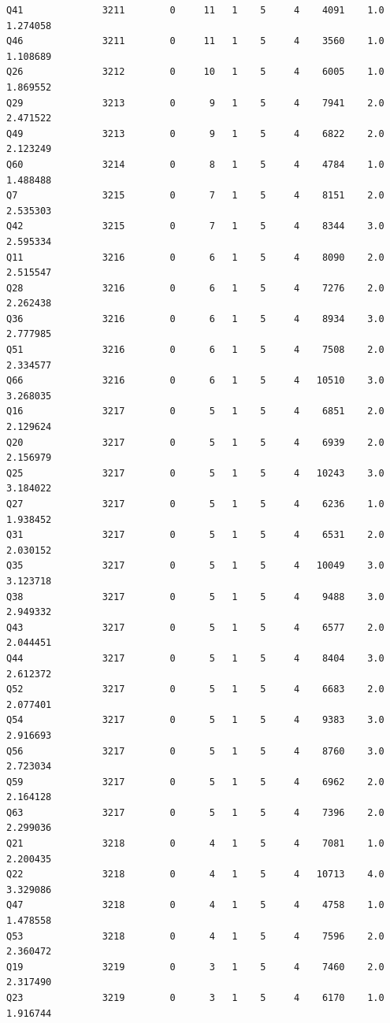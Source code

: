 \documentclass[
]{report}
\begin{document}
\begin{verbatim}
Q41              3211        0     11   1    5     4    4091    1.0    1.274058
Q46              3211        0     11   1    5     4    3560    1.0    1.108689
Q26              3212        0     10   1    5     4    6005    1.0    1.869552
Q29              3213        0      9   1    5     4    7941    2.0    2.471522
Q49              3213        0      9   1    5     4    6822    2.0    2.123249
Q60              3214        0      8   1    5     4    4784    1.0    1.488488
Q7               3215        0      7   1    5     4    8151    2.0    2.535303
Q42              3215        0      7   1    5     4    8344    3.0    2.595334
Q11              3216        0      6   1    5     4    8090    2.0    2.515547
Q28              3216        0      6   1    5     4    7276    2.0    2.262438
Q36              3216        0      6   1    5     4    8934    3.0    2.777985
Q51              3216        0      6   1    5     4    7508    2.0    2.334577
Q66              3216        0      6   1    5     4   10510    3.0    3.268035
Q16              3217        0      5   1    5     4    6851    2.0    2.129624
Q20              3217        0      5   1    5     4    6939    2.0    2.156979
Q25              3217        0      5   1    5     4   10243    3.0    3.184022
Q27              3217        0      5   1    5     4    6236    1.0    1.938452
Q31              3217        0      5   1    5     4    6531    2.0    2.030152
Q35              3217        0      5   1    5     4   10049    3.0    3.123718
Q38              3217        0      5   1    5     4    9488    3.0    2.949332
Q43              3217        0      5   1    5     4    6577    2.0    2.044451
Q44              3217        0      5   1    5     4    8404    3.0    2.612372
Q52              3217        0      5   1    5     4    6683    2.0    2.077401
Q54              3217        0      5   1    5     4    9383    3.0    2.916693
Q56              3217        0      5   1    5     4    8760    3.0    2.723034
Q59              3217        0      5   1    5     4    6962    2.0    2.164128
Q63              3217        0      5   1    5     4    7396    2.0    2.299036
Q21              3218        0      4   1    5     4    7081    1.0    2.200435
Q22              3218        0      4   1    5     4   10713    4.0    3.329086
Q47              3218        0      4   1    5     4    4758    1.0    1.478558
Q53              3218        0      4   1    5     4    7596    2.0    2.360472
Q19              3219        0      3   1    5     4    7460    2.0    2.317490
Q23              3219        0      3   1    5     4    6170    1.0    1.916744

\end{verbatim}
\end{document}
